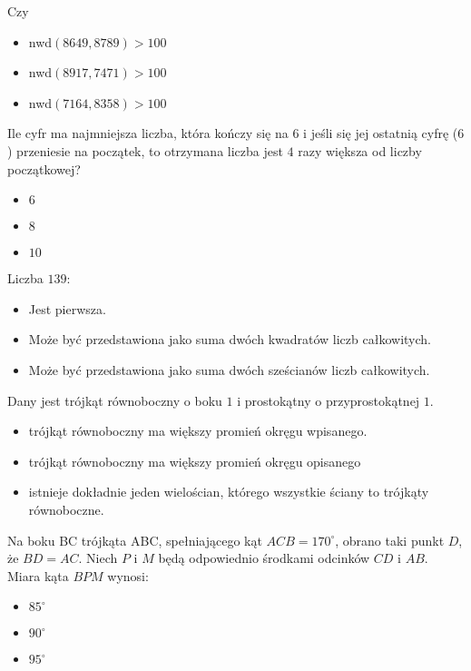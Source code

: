 \documentclass[12pt, a4paper]{article}
\newcommand{\question}[1]{\normalitem \begin{samepage}#1 \end{samepage}}
\newcommand{\cmark}{\textcolor{green}{T}}%
\newcommand{\xmark}{\textcolor{red}{N}}%
\newcommand{\yes}{\rlap{\framebox(15,15)} {\raisebox{2pt}{\large\hspace{-1pt}\cmark}}%
\hspace{3pt}}
\newcommand{\no}{\rlap{\framebox(15,15)} {\raisebox{2pt}{\large\hspace{-1pt}\xmark}}%
\hspace{3pt}}
\begin{document}
\begin{enumerate}
	\question{
		Czy
		
		\begin{itemize}
			\item [\no]nwd$(8649,8789) > 100$
			\item [\yes]nwd$(8917,7471)>100$
			\item [\yes]nwd$(7164,8358)>100$
		\end{itemize}
	}
	
	\question{
	    Ile cyfr ma najmniejsza liczba, która kończy się na $6$ i jeśli się jej ostatnią cyfrę ($6$) przeniesie na początek, to otrzymana liczba jest $4$ razy większa od liczby początkowej?

		\begin{itemize}
			\item [\yes]$6$
			\item [\no]$8$
			\item [\no]$10$
		\end{itemize}
	}
	
	\question {
		Liczba $139$:

		\begin{itemize}
			\item[\yes] Jest pierwsza.
			\item[\no] Może być przedstawiona jako suma dwóch kwadratów liczb całkowitych.
			\item [\no]Może być przedstawiona jako suma dwóch sześcianów liczb całkowitych.
		\end{itemize}
	}
	
	\question {
		Dany jest trójkąt równoboczny o boku $1$ i prostokątny o przyprostokątnej $1$.

    	\begin{itemize}
			\item [\no]trójkąt równoboczny ma większy promień okręgu wpisanego.
			\item [\no]trójkąt równoboczny ma większy promień okręgu opisanego
			\item [\no]istnieje dokładnie jeden wielościan, którego wszystkie ściany to trójkąty równoboczne.
		\end{itemize}
	}
	
	\question {
		Na boku BC trójkąta ABC, spełniającego kąt $ACB = 170^{\circ}$, obrano taki punkt $D$, że $BD = AC$. Niech $P$ i $M$ będą odpowiednio środkami odcinków $CD$ i $AB$. Miara kąta $BPM$ wynosi:

		\begin{itemize}
			\item [\yes]$85^{\circ}$
			\item [\no]$90^{\circ}$
			\item [\no]$95^{\circ}$
		\end{itemize}
	}
	

\end{enumerate}
\end{document}
